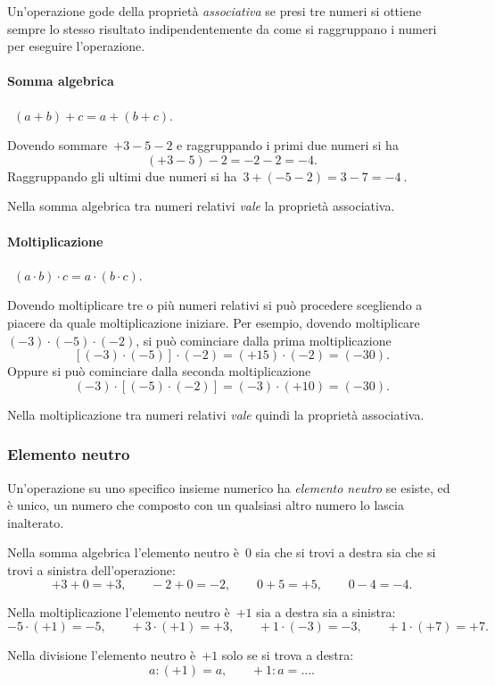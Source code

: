 Un'operazione gode della proprietà \emph{associativa} se presi tre numeri si ottiene sempre
lo stesso risultato indipendentemente da come si raggruppano i numeri per eseguire l'operazione.

\paragraph{Somma algebrica}~$(a + b)+c = a+(b+c)$.

Dovendo sommare~$+3-5-2$ e raggruppando i primi due numeri si ha
\[(+3-5)-2=-2-2=-4.\]
Raggruppando gli ultimi due numeri si ha~$3+(-5-2)=3-7 =-4~$.

Nella somma algebrica tra numeri relativi \emph{vale} la proprietà associativa.

\paragraph{Moltiplicazione}~$(a \cdot b)\cdot c = a\cdot (b\cdot c)$.

Dovendo moltiplicare tre o più numeri relativi si può procedere scegliendo a piacere da quale moltiplicazione iniziare.
Per esempio,
dovendo moltiplicare~$(-3)\cdot (-5)\cdot (-2)$,
si può cominciare dalla prima moltiplicazione \[[(-3)\cdot (-5)]\cdot (-2)=(+15)\cdot (-2)=(-30).\]
Oppure si può cominciare dalla seconda moltiplicazione \[(-3)\cdot [(-5)\cdot (-2)]=(-3)\cdot (+10)=(-30).\]

Nella moltiplicazione tra numeri relativi \emph{vale} quindi la proprietà associativa.

\subsubsection{Elemento neutro}

Un'operazione su uno specifico insieme numerico ha \emph{elemento neutro} se esiste, ed è unico, un numero che composto
con un qualsiasi altro numero lo lascia inalterato.

Nella somma algebrica l'elemento neutro è~0 sia che si trovi a destra sia che si trovi a sinistra dell'operazione:
\[+3+0=+3\text{,}\qquad -2+0=-2\text{,}\qquad~0+5=+5\text{,}\qquad~0-4=-4. \]	
		
Nella moltiplicazione l'elemento neutro è~$+1$ sia a destra sia a sinistra:
\[-5\cdot (+1) =-5\text{,}\qquad +3\cdot (+1) = +3\text{,}\qquad +1\cdot (-3) = -3\text{,}\qquad +1\cdot (+7) = +7.\]
		
Nella divisione l'elemento neutro è~$+1$ solo se si trova a destra:
\[a:(+1)=a\text{,}\qquad +1:a =\ldots. \]

